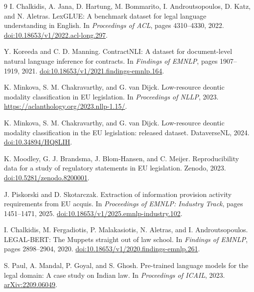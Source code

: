 \documentclass[11pt,a4paper]{article}
\begin{document}
\begin{thebibliography}{9}
I. Chalkidis, A. Jana, D. Hartung, M. Bommarito, I. Androutsopoulos, D. Katz, and N. Aletras.
LexGLUE: A benchmark dataset for legal language understanding in English.
In \emph{Proceedings of ACL}, pages 4310--4330, 2022.
\href{https://doi.org/10.18653/v1/2022.acl-long.297}{doi:10.18653/v1/2022.acl-long.297}.

Y. Koreeda and C. D. Manning.
ContractNLI: A dataset for document-level natural language inference for contracts.
In \emph{Findings of EMNLP}, pages 1907--1919, 2021.
\href{https://doi.org/10.18653/v1/2021.findings-emnlp.164}{doi:10.18653/v1/2021.findings-emnlp.164}.

K. Minkova, S. M. Chakravarthy, and G. van Dijck.
Low-resource deontic modality classification in EU legislation.
In \emph{Proceedings of NLLP}, 2023.
\url{https://aclanthology.org/2023.nllp-1.15/}.

K. Minkova, S. M. Chakravarthy, and G. van Dijck.
Low-resource deontic modality classification in the EU legislation: released dataset.
DataverseNL, 2024.
\href{https://doi.org/10.34894/HQ8LIH}{doi:10.34894/HQ8LIH}.

K. Moodley, G. J. Brandsma, J. Blom-Hansen, and C. Meijer.
Reproducibility data for a study of regulatory statements in EU legislation.
Zenodo, 2023.
\href{https://doi.org/10.5281/zenodo.8200001}{doi:10.5281/zenodo.8200001}.

J. Piskorski and D. Skotarczak.
Extraction of information provision activity requirements from EU acquis.
In \emph{Proceedings of EMNLP: Industry Track}, pages 1451--1471, 2025.
\href{https://doi.org/10.18653/v1/2025.emnlp-industry.102}{doi:10.18653/v1/2025.emnlp-industry.102}.

I. Chalkidis, M. Fergadiotis, P. Malakasiotis, N. Aletras, and I. Androutsopoulos.
LEGAL-BERT: The Muppets straight out of law school.
In \emph{Findings of EMNLP}, pages 2898--2904, 2020.
\href{https://doi.org/10.18653/v1/2020.findings-emnlp.261}{doi:10.18653/v1/2020.findings-emnlp.261}.

S. Paul, A. Mandal, P. Goyal, and S. Ghosh.
Pre-trained language models for the legal domain: A case study on Indian law.
In \emph{Proceedings of ICAIL}, 2023.
\href{https://arxiv.org/abs/2209.06049}{arXiv:2209.06049}.
\end{thebibliography}
\end{document}
